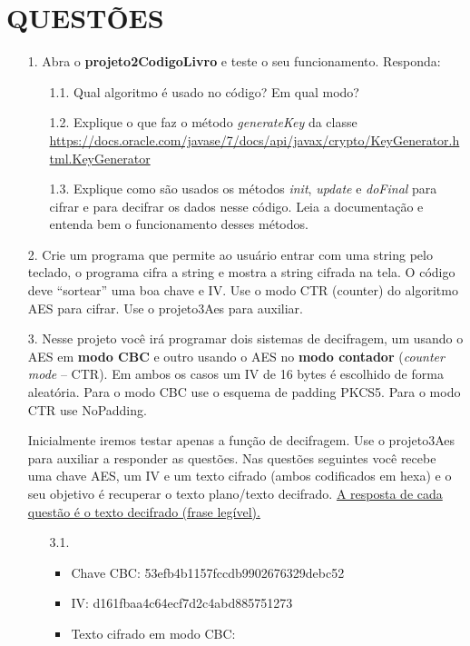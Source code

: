 \documentclass[12pt,a4paper]{article}
\newcommand{\link}[1]{{\color{blue}\url{#1}}}
\begin{document}
	\section{\normalsize QUESTÕES}
		\begin{enumerate}
			\item[1.] Abra o \textbf{projeto2CodigoLivro} e teste o seu funcionamento. Responda:
			
			\begin{enumerate}
				\item[1.1.] Qual algoritmo é usado no código? Em qual modo?
				
				\item[1.2.] Explique o que faz o método \textit{generateKey} da classe \link{https://docs.oracle.com/javase/7/docs/api/javax/crypto/KeyGenerator.html.KeyGenerator}
				
				\item[1.3.] Explique como são usados os métodos \textit{init}, \textit{update} e \textit{doFinal} para cifrar e para decifrar os dados nesse código. Leia a documentação e entenda bem o funcionamento desses métodos.
			\end{enumerate}
			
			\item[2.] Crie um programa que permite ao usuário entrar com uma string pelo teclado, o programa cifra a string e mostra a string cifrada na tela. O código deve ``sortear'' uma boa chave e IV. Use o modo CTR (counter) do algoritmo AES para cifrar. Use o projeto3Aes para auxiliar.
			
			\item[3.] Nesse projeto você irá programar dois sistemas de decifragem, um usando o AES em \textbf{modo CBC} e outro usando o AES no \textbf{modo contador} (\textit{counter mode} -- CTR). Em ambos os casos um IV de 16 bytes é escolhido de forma aleatória. Para o modo CBC use o esquema de padding PKCS5. Para o modo CTR use NoPadding.
			
				Inicialmente iremos testar apenas a função de decifragem. Use o projeto3Aes para auxiliar a responder as questões. Nas questões seguintes você recebe uma chave AES, um IV e um texto cifrado (ambos
codificados em hexa) e o seu objetivo é recuperar o texto plano/texto decifrado. \uline{A resposta de cada questão é o texto decifrado (frase legível).}
				
				\begin{enumerate}
					\item[3.1.] 
						\begin{itemize}
							\item Chave CBC: 53efb4b1157fccdb9902676329debc52
							\item IV: d161fbaa4c64ecf7d2c4abd885751273
							\item Texto cifrado em modo CBC: 
						\end{itemize}
						

\end{enumerate}
\end{enumerate}
\end{document}
